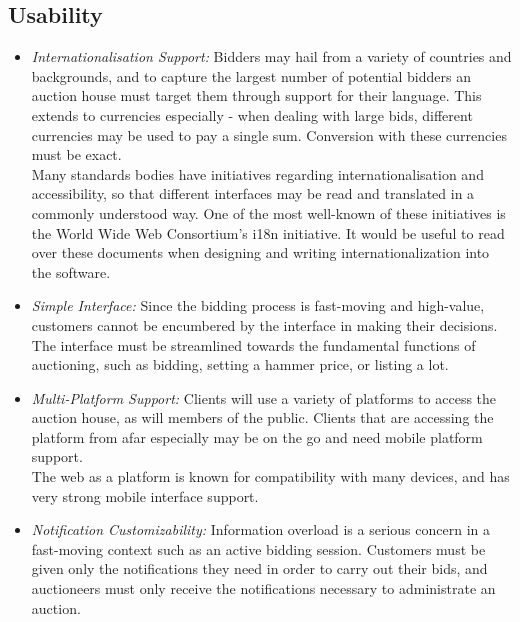 \documentclass[titlepage, 12pt]{extarticle}
\begin{document}
\subsection{Usability}
\begin{itemize}
\item {\it Internationalisation Support:} Bidders may hail from a variety of countries and backgrounds, and to capture the largest number of potential bidders an auction house must target them through support for their language. This extends to currencies especially - when dealing with large bids, different currencies may be used to pay a single sum. Conversion with these currencies must be exact.
\\Many standards bodies have initiatives regarding internationalisation and accessibility, so that different interfaces may be read and translated in a commonly understood way. One of the most well-known of these initiatives is the World Wide Web Consortium's i18n initiative. It would be useful to read over these documents when designing and writing internationalization into the software.
\item {\it Simple Interface:} Since the bidding process is fast-moving and high-value, customers cannot be encumbered by the interface in making their decisions. The interface must be streamlined towards the fundamental functions of auctioning, such as bidding, setting a hammer price, or listing a lot.
\item {\it Multi-Platform Support:} Clients will use a variety of platforms to access the auction house, as will members of the public. Clients that are accessing the platform from afar especially may be on the go and need mobile platform support.
\\The web as a platform is known for compatibility with many devices, and has very strong mobile interface support.
\item {\it Notification Customizability:} Information overload is a serious concern in a fast-moving context such as an active bidding session. Customers must be given only the notifications they need in order to carry out their bids, and auctioneers must only receive the notifications necessary to administrate an auction.
\end{itemize}
\end{document}

